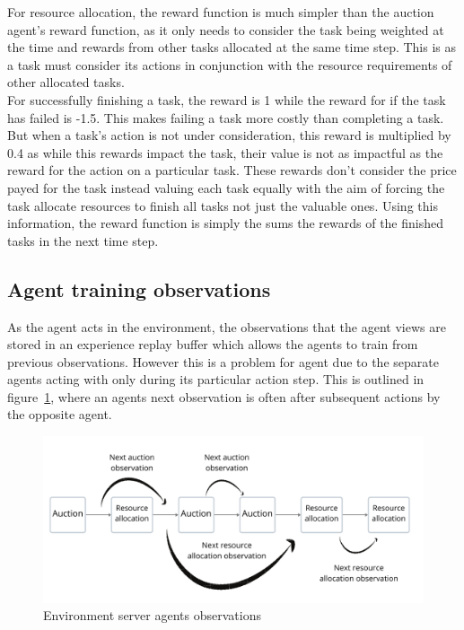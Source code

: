 For resource allocation, the reward function is much simpler than the auction agent's reward function, as it only needs
to consider the task being weighted at the time and rewards from other tasks allocated at the same time step. This is
as a task must consider its actions in conjunction with the resource requirements of other allocated tasks. \\
For successfully finishing a task, the reward is 1 while the reward for if the task has failed is -1.5. This makes
failing a task more costly than completing a task. But when a task's action is not under consideration, this reward is
multiplied by 0.4 as while this rewards impact the task, their value is not as impactful as the reward for the action
on a particular task. These rewards don't consider the price payed for the task instead valuing each task equally with
the aim of forcing the task allocate resources to finish all tasks not just the valuable ones. Using this information,
the reward function is simply the sums the rewards of the finished tasks in the next time step.

\subsection{Agent training observations}\label{subsec:agent-training-observations}
As the agent acts in the environment, the observations that the agent views are stored in an experience replay buffer
which allows the agents to train from previous observations. However this is a problem for agent due to the separate
agents acting with only during its particular action step. This is outlined in figure~\ref{fig:environment-observations},
where an agents next observation is often after subsequent actions by the opposite agent.

\begin{figure}
    \centering
    \includegraphics[width=14cm]{figures/implementation_fig/env_server_agents_observations.pdf}
    \caption{Environment server agents observations}
    \label{fig:environment-observations}
\end{figure}

